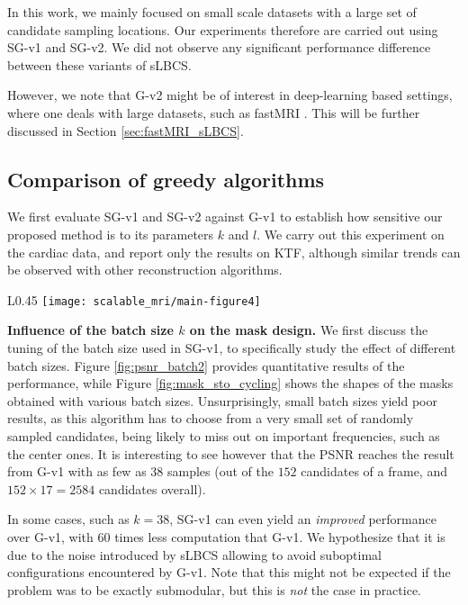 \begin{remark}
    In this work, we mainly focused on small scale datasets with a large set of candidate sampling locations. Our experiments therefore are carried out using SG-v1 and SG-v2. We did not observe any significant performance difference between these variants of sLBCS. 
    
    However, we note that G-v2 might be of interest in deep-learning based settings, where one deals with large datasets, such as fastMRI \citep{zbontarFastMRIOpenDataset2019}. This will be further discussed in Section \ref{sec:fastMRI_sLBCS}.
\end{remark}


\subsection{Comparison of greedy algorithms}
We first evaluate SG-v1 and SG-v2 against G-v1 to establish how sensitive our proposed method is to its parameters $k$ and $l$. We carry out this experiment on the cardiac data, and report only the results on KTF, although similar trends can be observed with other reconstruction algorithms.

\begin{wrapfigure}{L}{0.45\linewidth}
    \centering
    \texttt{[image: scalable\_mri/main-figure4]}
    \caption{PSNR as a function of the rate for KTF, comparing the effect of the batch size on the quality of the reconstruction for SG-v1. The result is averaged on $4$ testing images of size $152\times 152\times 17$.}\label{fig:psnr_batch2}
\end{wrapfigure}

\textbf{Influence of the batch size $k$ on the mask design.}  We first discuss the tuning of the batch size used in SG-v1, to specifically study the effect of different batch sizes. Figure \ref{fig:psnr_batch2} provides quantitative results of the performance, while Figure \ref{fig:mask_sto_cycling} shows the shapes of the masks obtained with various batch sizes. Unsurprisingly, small batch sizes yield poor results, as this algorithm has to choose from a very small set of randomly sampled candidates, being likely to miss out on important frequencies, such as the center ones. It is interesting to see however that the PSNR reaches the result from G-v1 with as few as 38 samples (out of the $152$ candidates of a frame, and $152 \times 17 = 2584$ candidates overall).

In some cases, such as $k=38$, SG-v1 can even yield an \textit{improved} performance over G-v1, with $60$ times less computation that G-v1. We hypothesize that it is due to the noise introduced by sLBCS allowing to avoid suboptimal configurations encountered by G-v1. Note that this might not be expected if the problem was to be exactly submodular, but this is \textit{not} the case in practice. 


